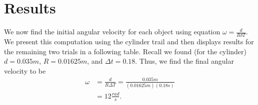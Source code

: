 \documentclass{report}
\begin{document}
    \section{Results}
    \bigbreak \noindent 
    We now find the initial angular velocity for each object using equation $\omega = \frac{d}{R\delta T} $. We present this computation using the cylinder trail and then displays results for the remaining two trials in a following table.
    \bigbreak \noindent 
    Recall we found (for the cylinder) $d = 0.035m$, $R=0.01625m$, and $\Delta t = 0.18$. Thus, we find the final angular velocity to be 
    \begin{align*}
        \omega &= \frac{d}{R\Delta T} = \frac{0.035m}{(0.01625m)(0.18s)} \\
        &=12 \frac{rad}{s}
    .\end{align*}
    \bigbreak \noindent 
\end{document}
